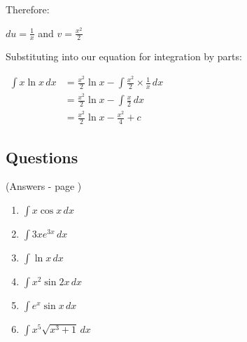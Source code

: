 \documentclass[../main.tex]{subfiles}
\begin{document}
Therefore:

\(du=\frac{1}{x}\) and \(v=\frac{x^2}{2}\)

Substituting into our equation for integration by parts:

$
\!
\begin{aligned}
    \int x\ln{x}\, dx
    &= \frac{x^2}{2}\ln{x}-\int \frac{x^2}{2}\times \frac{1}{x}\, dx\\
    &=\frac{x^2}{2}\ln{x}-\int \frac{x}{2}\, dx\\
    &=\frac{x^2}{2}\ln{x}-\frac{x^2}{4}+c
\end{aligned}
$

\pagebreak

\subsection*{Questions}
(Answers - page \pageref*{Integration by parts answers})
\label{Integration by parts}

\begin{enumerate}
    \item \(\int x\cos{x} \, dx\)

    \item \(\int 3xe^{3x}\, dx\)

    \item \(\int \ln{x}\, dx\)

    \item \(\int x^2 \sin{2x} \, dx\)

    \item \(\int e^x \sin{x}\, dx\)

    \item \(\int x^5 \sqrt{x^3+1}\, dx\)
    
    
\end{enumerate}


\pagebreak
\end{document}
